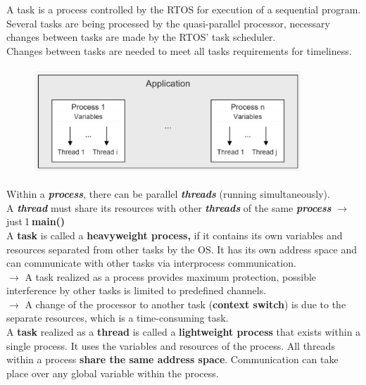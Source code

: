 A task is a process controlled by the RTOS for execution of a sequential program. Several tasks are being processed by the quasi-parallel processor, necessary changes between tasks are made by the RTOS' task scheduler.\\

Changes between tasks are needed to meet all tasks requirements for timeliness.

	\begin{figure}[h]
    \centering
    \includegraphics[width=10cm, height=4cm]{Images/image80.png}
    \label{fig:Fig 26}
    \end{figure}

Within a \textbf{\textit{process}}, there can be parallel \textbf{\textit{threads}} (running simultaneously). \\

A \textbf{\textit{thread}} must share its resources with other \textbf{\textit{threads}} of the same \textbf{\textit{process}} $\rightarrow$  just${}_{\ }$1${}_{\ }$\textbf{main()}\\

A \textbf{task} is called a \textbf{heavyweight process, }if it contains its own variables and resources separated from other tasks by the OS. It has its own address space and can communicate with other tasks via interprocess communication. \\

$\rightarrow$ A task realized as a process provides maximum protection, possible interference by other tasks is limited to predefined channels. \\

$\rightarrow$ A change of the processor to another task (\textbf{context switch}) is due to the separate resources, which is a time-consuming task.\\

A \textbf{task} realized as a \textbf{thread} is called a \textbf{lightweight process} that exists within a single process. It uses the variables and resources of the process. All threads within a process \textbf{share the same address space}. Communication can take place over any global variable within the process.

